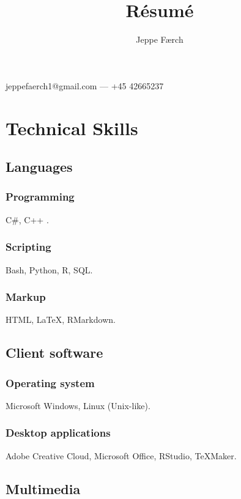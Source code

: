 \documentclass[12]{article}
\makeatletter
\renewcommand{\maketitle}{
\begin{center}
{\huge\bfseries
\theauthor} 

\vspace{.25em}

jeppefaerch1@gmail.com --- +45 42665237

\end{center}
}
\makeatother
\begin{document}
\title{R\'esum\'e}
\author{Jeppe Færch}

\maketitle

\section{Technical Skills}

\subsection{Languages}

\subsubsection{Programming}

C\#, C++ .

\subsubsection{Scripting}

Bash, Python, R, SQL.

\subsubsection{Markup}

 HTML, {\LaTeX},  RMarkdown.

\subsection{Client software}

\subsubsection{Operating system}

Microsoft Windows, Linux (Unix-like).

\subsubsection{Desktop applications}

Adobe Creative Cloud, Microsoft Office,  RStudio, TeXMaker.

\subsection{Multimedia}
\end{document}
